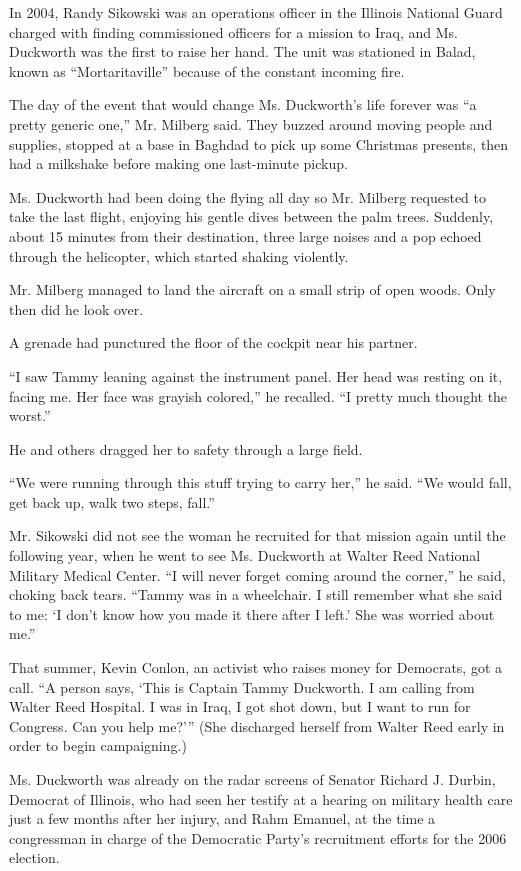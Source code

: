 In 2004, Randy Sikowski was an operations officer in the Illinois
National Guard charged with finding commissioned officers for a mission
to Iraq, and Ms. Duckworth was the first to raise her hand. The unit was
stationed in Balad, known as ``Mortaritaville'' because of the constant
incoming fire.

The day of the event that would change Ms. Duckworth's life forever was
``a pretty generic one,'' Mr. Milberg said. They buzzed around moving
people and supplies, stopped at a base in Baghdad to pick up some
Christmas presents, then had a milkshake before making one last-minute
pickup.

Ms. Duckworth had been doing the flying all day so Mr. Milberg requested
to take the last flight, enjoying his gentle dives between the palm
trees. Suddenly, about 15 minutes from their destination, three large
noises and a pop echoed through the helicopter, which started shaking
violently.

Mr. Milberg managed to land the aircraft on a small strip of open woods.
Only then did he look over.

A grenade had punctured the floor of the cockpit near his partner.

``I saw Tammy leaning against the instrument panel. Her head was resting
on it, facing me. Her face was grayish colored,'' he recalled. ``I
pretty much thought the worst.''

He and others dragged her to safety through a large field.

``We were running through this stuff trying to carry her,'' he said.
``We would fall, get back up, walk two steps, fall.''

Mr. Sikowski did not see the woman he recruited for that mission again
until the following year, when he went to see Ms. Duckworth at Walter
Reed National Military Medical Center. ``I will never forget coming
around the corner,'' he said, choking back tears. ``Tammy was in a
wheelchair. I still remember what she said to me: `I don't know how you
made it there after I left.' She was worried about me.''

That summer, Kevin Conlon, an activist who raises money for Democrats,
got a call. ``A person says, `This is Captain Tammy Duckworth. I am
calling from Walter Reed Hospital. I was in Iraq, I got shot down, but I
want to run for Congress. Can you help me?''' (She discharged herself
from Walter Reed early in order to begin campaigning.)

Ms. Duckworth was already on the radar screens of Senator Richard J.
Durbin, Democrat of Illinois, who had seen her testify at a hearing on
military health care just a few months after her injury, and Rahm
Emanuel, at the time a congressman in charge of the Democratic Party's
recruitment efforts for the 2006 election.

